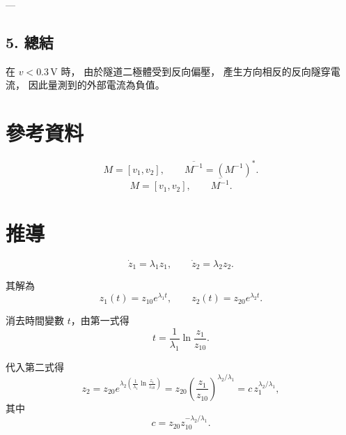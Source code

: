 \documentclass{article}
\begin{document}
---

\subsection*{5. 總結}

\begin{tcolorbox}[colback=yellow!5!white, colframe=black!75, boxrule=0.8pt, title=結論]
在 \( v < 0.3\,\mathrm{V} \) 時，
由於隧道二極體受到反向偏壓，
產生方向相反的反向隧穿電流，
因此量測到的外部電流為負值。
\end{tcolorbox}

\section*{參考資料}
\[
M = [v_1, v_2],
\qquad
\overline{M^{-1}} = (M^{-1})^{*}.
\]
\[
M = [v_1, v_2],
\qquad
\overline{M^{-1}}.
\]
\section*{推導}
\[
\dot{z}_1 = \lambda_1 z_1, 
\qquad 
\dot{z}_2 = \lambda_2 z_2.
\]

其解為
\[
z_1(t) = z_{10} e^{\lambda_1 t}, 
\qquad 
z_2(t) = z_{20} e^{\lambda_2 t}.
\]

消去時間變數 \(t\)，由第一式得
\[
t = \frac{1}{\lambda_1} \ln \frac{z_1}{z_{10}}.
\]

代入第二式得
\[
z_2 = z_{20} e^{\lambda_2 \left( \frac{1}{\lambda_1} \ln \frac{z_1}{z_{10}} \right)}
     = z_{20} \left( \frac{z_1}{z_{10}} \right)^{\lambda_2 / \lambda_1}
     = c\, z_1^{\lambda_2 / \lambda_1},
\]
其中
\[
c = z_{20} z_{10}^{-\lambda_2 / \lambda_1}.
\]
\end{document}
